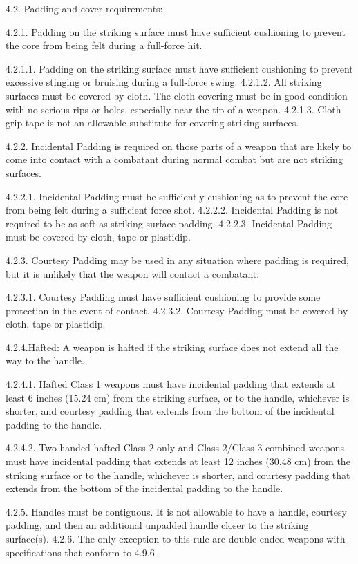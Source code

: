 \documentclass[12pt]{article}
\begin{document}
\begin{level}[start=0]
4.2. Padding and cover requirements:

4.2.1. Padding on the striking surface must have sufficient cushioning to prevent the core from being felt during a full-force hit.

4.2.1.1. Padding on the striking surface must have sufficient cushioning to prevent excessive stinging or bruising during a full-force swing.
4.2.1.2. All striking surfaces must be covered by cloth. The cloth covering must be in good condition with no serious rips or holes, especially near the tip of a weapon.
4.2.1.3. Cloth grip tape is not an allowable substitute for covering striking surfaces.

4.2.2. Incidental Padding is required on those parts of a weapon that are likely to come into contact with a combatant during normal combat but are not striking surfaces.

4.2.2.1. Incidental Padding must be sufficiently cushioning as to prevent the core from being felt during a sufficient force shot.
4.2.2.2. Incidental Padding is not required to be as soft as striking surface padding.
4.2.2.3. Incidental Padding must be covered by cloth, tape or plastidip.

4.2.3. Courtesy Padding may be used in any situation where padding is required, but it is unlikely that the weapon will contact a combatant.

4.2.3.1. Courtesy Padding must have sufficient cushioning to provide some protection in the event of contact.
4.2.3.2. Courtesy Padding must be covered by cloth, tape or plastidip.

4.2.4.Hafted: A weapon is hafted if the striking surface does not extend all the way to the handle.

4.2.4.1. Hafted Class 1 weapons must have incidental padding that extends at least 6 inches (15.24 cm) from the striking surface, or to the handle, whichever is shorter, and courtesy padding that extends from the bottom of the incidental padding to the handle.

4.2.4.2. Two-handed hafted Class 2 only and Class 2/Class 3 combined weapons must have incidental padding that extends at least 12 inches (30.48 cm) from the striking surface or to the handle, whichever is shorter, and courtesy padding that extends from the bottom of the incidental padding to the handle.

4.2.5. Handles must be contiguous. It is not allowable to have a handle, courtesy padding, and then an additional unpadded handle closer to the striking surface(s).
4.2.6. The only exception to this rule are double-ended weapons with specifications that conform to 4.9.6.


\end{level}
\end{document}
